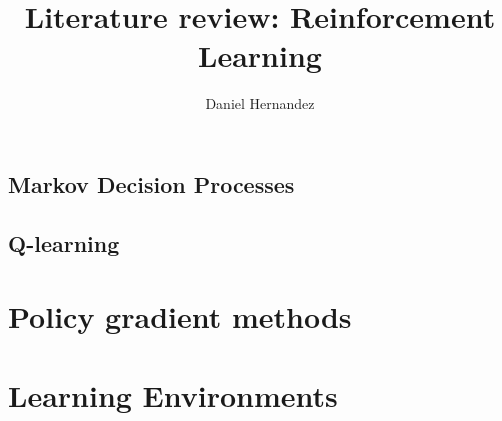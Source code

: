 \documentclass{article}
\title{\textbf{Literature review: Reinforcement Learning}}
\author{Daniel Hernandez}
\date{ }
\begin{document}
\maketitle


% 
% 
%
%
    \subsection{Markov Decision Processes}\label{section:markov-decision-processes}
    

    
    \subsection{Q-learning}\label{section:q-learning}
    
 
\section{Policy gradient methods}\label{section:policy-gradient}

%
% 
% 
% 

\section{Learning Environments}

\end{document}
